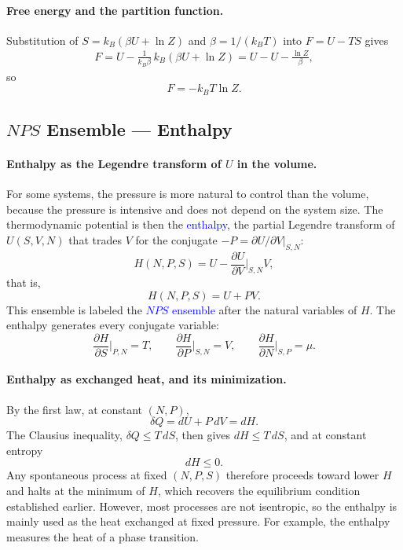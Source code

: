 \paragraph{Free energy and the partition function.}
Substitution of $S=k_B(\beta U+\ln Z)$ and $\beta=1/(k_BT)$ into $F=U-TS$
gives
\begin{align*}
    F=U-\frac{1}{k_B\beta}\,k_B\left(\beta U+\ln Z\right)
    =U-U-\frac{\ln Z}{\beta},
\end{align*}
so
\begin{equation}
    \boxed{F=-k_BT\ln Z.}
\end{equation}

\subsection{$NPS$ Ensemble --- Enthalpy}

\paragraph{Enthalpy as the Legendre transform of $U$ in the volume.}
For some systems, the pressure is more natural to control than the volume,
because the pressure is intensive and does not depend on the system size.
The thermodynamic potential is then the \textcolor{blue}{enthalpy}, the
partial Legendre transform of $U(S,V,N)$ that trades $V$ for the conjugate
$-P=\partial U/\partial V|_{S,N}$:
\begin{equation*}
    H(N,P,S)=U-\frac{\partial U}{\partial V}\bigg|_{S,N}V,
\end{equation*}
that is,
\begin{equation}
    \boxed{H(N,P,S)=U+PV.}
\end{equation}
This ensemble is labeled the \textcolor{blue}{$NPS$ ensemble} after the
natural variables of $H$. The enthalpy generates every conjugate variable:
\begin{equation}
    \boxed{\frac{\partial H}{\partial S}\bigg|_{P,N}=T,\qquad
    \frac{\partial H}{\partial P}\bigg|_{S,N}=V,\qquad
    \frac{\partial H}{\partial N}\bigg|_{S,P}=\mu.}
\end{equation}

\paragraph{Enthalpy as exchanged heat, and its minimization.}
By the first law, at constant $(N,P)$,
\begin{equation}
    \boxed{\delta Q=dU+P\,dV=dH.}
\end{equation}
The Clausius inequality, $\delta Q\leq T\,dS$, then gives $dH\leq T\,dS$, and
at constant entropy
\begin{equation}
    \boxed{dH\leq0.}
\end{equation}
Any spontaneous process at fixed $(N,P,S)$ therefore proceeds toward lower
$H$ and halts at the minimum of $H$, which recovers the equilibrium condition
established earlier. However, most processes are not isentropic, so the
enthalpy is mainly used as the heat exchanged at fixed pressure. For
example, the enthalpy measures the heat of a phase transition.

